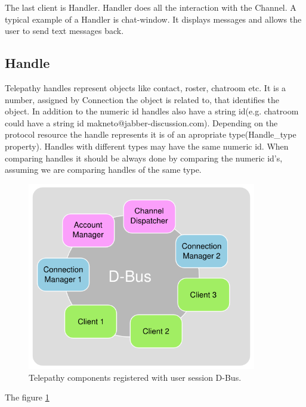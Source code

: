 The last client is Handler. Handler does all the interaction with the Channel. A typical example of a Handler is chat-window. It displays messages and allows the user to send text messages back.\cite{tpWikiClient}  

\subsection*{Handle}
Telepathy handles represent objects like contact, roster, chatroom etc. It is a number, assigned by Connection the object is related to, that identifies the object. In addition to the numeric id handles also have a string id(e.g. chatroom could have a string id makneto@jabber-discussion.com). Depending on the protocol resource the handle represents it is of an apropriate type(Handle\_type property). Handles with different types may have the same numeric id. When comparing handles it should be always done by comparing the numeric id's, assuming we are comparing handles of the same type.\cite{tpWikiHandle} 


\begin{figure}[ht]
\begin{center}
	\includegraphics[width=10cm]{fig/telepathy-components-dbus.png}
	\caption{Telepathy components registered with user session D-Bus.\cite{tpWikiClient}}
	\label{fig:telepathyComponentsDbus}
\end{center}
\end{figure}

The figure \ref{fig:telepathyComponentsDbus}


